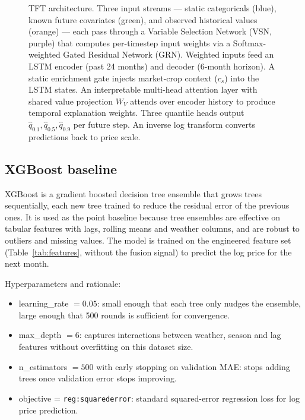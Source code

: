 \documentclass[conference,twoside]{IEEEtran}
\begin{document}
\begin{figure}[t]
\caption{TFT architecture. Three input streams --- static categoricals (blue), known future covariates (green), and observed historical values (orange) --- each pass through a Variable Selection Network (VSN, purple) that computes per-timestep input weights via a Softmax-weighted Gated Residual Network (GRN). Weighted inputs feed an LSTM encoder (past 24 months) and decoder (6-month horizon). A static enrichment gate injects market-crop context ($c_s$) into the LSTM states. An interpretable multi-head attention layer with shared value projection $W_V$ attends over encoder history to produce temporal explanation weights. Three quantile heads output $\hat{q}_{0.1},\hat{q}_{0.5},\hat{q}_{0.9}$ per future step. An inverse log transform converts predictions back to price scale.}
\label{fig:tft_architecture}
\end{figure}

\subsection{XGBoost baseline}
XGBoost \cite{chen2016xgboost} is a gradient boosted decision tree ensemble that grows trees sequentially, each new tree trained to reduce the residual error of the previous ones. It is used as the point baseline because tree ensembles are effective on tabular features with lags, rolling means and weather columns, and are robust to outliers and missing values. The model is trained on the engineered feature set (Table~\ref{tab:features}, without the fusion signal) to predict the log price for the next month.

Hyperparameters and rationale:
\begin{itemize}
    \item learning\_rate $= 0.05$: small enough that each tree only nudges the ensemble, large enough that 500 rounds is sufficient for convergence.
    \item max\_depth $= 6$: captures interactions between weather, season and lag features without overfitting on this dataset size.
    \item n\_estimators $= 500$ with early stopping on validation MAE: stops adding trees once validation error stops improving.
    \item objective = \texttt{reg:squarederror}: standard squared-error regression loss for log price prediction.
\end{itemize}
\end{document}
